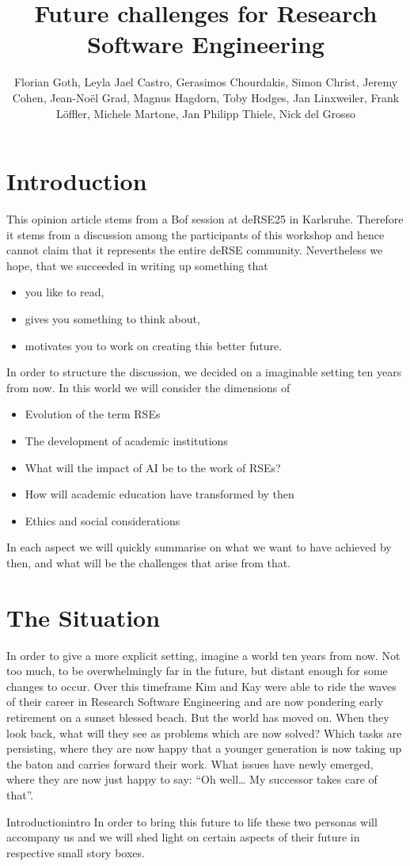 \documentclass{eceasst}
\title{Future challenges for Research Software Engineering} %
\author{
Florian Goth\texorpdfstring{\autref{1}}{},
Leyla Jael Castro\texorpdfstring{\autref{1}}{},
Gerasimos Chourdakis\texorpdfstring{\autref{1}}{},
Simon Christ\texorpdfstring{\autref{1}}{},
Jeremy Cohen\texorpdfstring{\autref{1}}{},
Jean-Noël Grad\texorpdfstring{\autref{1}}{},
Magnus Hagdorn\texorpdfstring{\autref{1}}{},
Toby Hodges\texorpdfstring{\autref{1}}{},
Jan Linxweiler\texorpdfstring{\autref{1}}{},
Frank Löffler\texorpdfstring{\autref{1}}{},
Michele Martone\texorpdfstring{\autref{1}}{},
Jan Philipp Thiele\texorpdfstring{\autref{1}}{},
Nick del Grosso\texorpdfstring{\autref{1}}{}
} %
\institute{\autlabel{1} Fantasy University} %
\begin{document}
\maketitle

\section{Introduction}
This opinion article stems from a Bof session at deRSE25 in Karlsruhe\cite{Goth2025EndRSEng}.
Therefore it stems from a discussion among the participants of this workshop and hence cannot claim that it represents the entire deRSE community.
Nevertheless we hope, that we succeeded in writing up something that
\begin{itemize}
\item you like to read,
\item gives you something to think about,
\item motivates you to work on creating this better future.
\end{itemize}
In order to structure the discussion, we decided on a imaginable setting ten years from now. 
In this world we will consider the dimensions of 
\begin{itemize}
\item Evolution of the term RSEs
\item The development of academic institutions
\item What will the impact of AI be to the work of RSEs?
\item How will academic education have transformed by then
\item Ethics and social considerations
\end{itemize}
In each aspect we will quickly summarise on what we want to have achieved by then, and what will be the challenges that arise from that.



\section{The Situation}
In order to give a more explicit setting, imagine a world ten years from now.
Not too much, to be overwhelmingly far in the future, but distant enough for some changes to occur.
Over this timeframe Kim\cite{Anzt2021} and Kay\cite{competencies-F1000}
were able to ride the waves of their career in Research Software Engineering and are now pondering early retirement on a sunset blessed beach.
But the world has moved on.
When they look back, what will they see as problems which are now solved?
Which tasks are persisting, where they are now happy that a younger generation is now taking up the baton and carries forward their work.
What issues have newly emerged, where they are now just happy to say: “Oh well… My successor takes care of that”.
\begin{story}{Introduction}{intro}
In order to bring this future to life these two personas will accompany us and we will shed light on certain aspects
of their future in respective small story boxes.
 \end{story}
\end{document}
